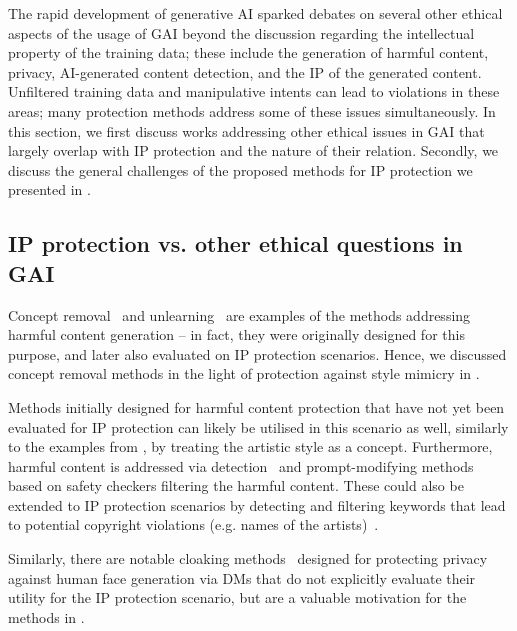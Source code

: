 

The rapid development of generative AI sparked debates on several other ethical aspects of the usage of GAI beyond the discussion regarding the intellectual property of the training data; these include the generation of harmful content, privacy, AI-generated content detection, and the IP of the generated content. 
Unfiltered training data and manipulative intents can lead to violations in these areas; many protection methods address some of these issues simultaneously. 
In this section, we first discuss works addressing other ethical issues in GAI that largely overlap with IP protection and the nature of their relation. 
Secondly, we discuss the general challenges of the proposed methods for IP protection we presented in .

\subsection{IP protection vs. other ethical questions in GAI}
Concept removal~\cite{liu_geom-erasing_2023,ho_classifier-free_2022} and unlearning~\cite{wu_erasediff_2024} are examples of the methods addressing harmful content generation -- in fact, they were originally designed for this purpose, and later also evaluated on IP protection scenarios.
Hence, we discussed concept removal methods in the light of protection against style mimicry in . 

Methods initially designed for harmful content protection that have not yet been evaluated for IP protection can likely be utilised in this scenario as well, similarly to the examples from , by treating the artistic style as a concept.
Furthermore, harmful content is addressed via detection~\cite{rando_red-teaming_2022} and prompt-modifying methods~\cite{hanu_detoxify_2020} based on safety checkers filtering the harmful content. 
These could also be extended to IP protection scenarios by detecting and filtering keywords that lead to potential copyright violations (e.g. names of the artists)~\cite{noauthor_openai_2023}.

Similarly, there are notable cloaking methods~\cite{wu_towards_2023} designed for protecting privacy against human face generation via DMs that do not explicitly evaluate their utility for the IP protection scenario, but are a valuable motivation for the methods in .

